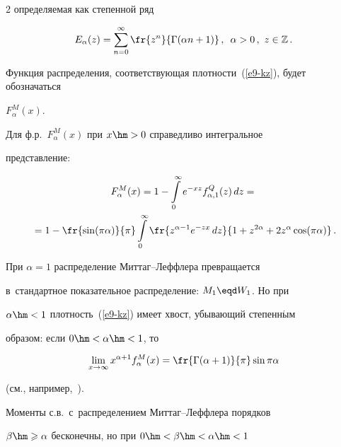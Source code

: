 \begin{multicols}{2}
определяемая как степенной ряд


$$


E_{\alpha}(z)=\sum\limits_{n=0}^{\infty}\fr{z^n}{\Gamma(\alpha


n+1)}\,,\enskip \alpha>0\,,\ z\in\mathbb{Z}\,.


$$


Функция распределения, соответствующая плотности~(\ref{e9-kz}), будет обозначаться


$F_{\alpha}^{M}(x)$.





Для ф.р.~$F_{\alpha}^{M}(x)$ при $x\hm>0$ справедливо интегральное


представление:


\begin{multline}


F_{\alpha}^{M}(x)=1-\int\limits_{0}^{\infty}e^{-xz}f_{\alpha,1}^{Q}(z)\,dz={}\\


{}=


1-\fr{\sin(\pi\alpha)}{\pi}\int\limits_{0}^{\infty}


\fr{z^{\alpha-1}e^{-zx}\,dz}{1+z^{2\alpha}+2z^{\alpha}\cos(\pi\alpha)}\,.


\label{e10-kz}


\end{multline}





При $\alpha=1$ распределение Мит\-таг--Леф\-фле\-ра превращается 


в~стандартное показательное распределение: $M_1\eqd W_1$. Но при


$\alpha\hm<1$ плотность~(\ref{e9-kz}) имеет хвост, убывающий степенн$\acute{\mbox{ы}}$м


образом: если $0\hm<\alpha\hm<1$, то


$$


\lim\limits_{x\to\infty}x^{\alpha+1}f_\alpha^{M}(x)=


\fr{\Gamma(\alpha+1)}{\pi}\sin\pi\alpha


$$


(см., например,~\cite{Kilbas2014}).





Моменты с.в.\ с~распределением Мит\-таг--Леф\-фле\-ра порядков


$\beta\hm\geqslant\alpha$ бесконечны, но при $0\hm<\beta\hm<\alpha\hm<1$



\end{multicols}
